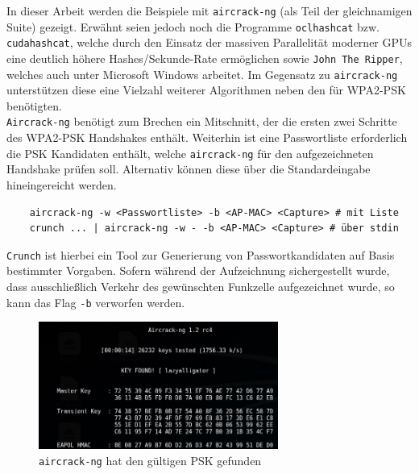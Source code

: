 In dieser Arbeit werden die Beispiele mit \texttt{aircrack-ng} (als Teil der gleichnamigen Suite) gezeigt. Erwähnt seien jedoch noch die Programme \texttt{oclhashcat} bzw. \texttt{cudahashcat}, welche durch den Einsatz der massiven Parallelität moderner GPUs eine deutlich höhere Hashes/Sekunde-Rate ermöglichen sowie \texttt{John The Ripper}, welches auch unter Microsoft Windows arbeitet. Im Gegensatz zu \texttt{aircrack-ng} unterstützen diese eine Vielzahl weiterer Algorithmen neben den für WPA2-PSK benötigten.\\

\texttt{Aircrack-ng} benötigt zum Brechen ein Mitschnitt, der die ersten zwei Schritte des WPA2-PSK Handshakes enthält.
Weiterhin ist eine Passwortliste erforderlich die PSK Kandidaten enthält, welche \texttt{aircrack-ng} für den aufgezeichneten Handshake prüfen soll. Alternativ können diese über die Standardeingabe hineingereicht werden.
\begin{Verbatim}
	aircrack-ng -w <Passwortliste> -b <AP-MAC> <Capture> # mit Liste
	crunch ... | aircrack-ng -w - -b <AP-MAC> <Capture> # über stdin
\end{Verbatim}
\texttt{Crunch} ist hierbei ein Tool zur Generierung von Passwortkandidaten auf Basis bestimmter Vorgaben.
Sofern während der Aufzeichnung sichergestellt wurde, dass ausschließlich Verkehr des gewünschten Funkzelle aufgezeichnet wurde, so kann das Flag \texttt{-b} verworfen werden.

\begin{figure}[ht]
	\centering
	\includegraphics[width=0.7\textwidth]{graphics/aircrack_success}
	\caption[Aircrack-ng]{\texttt{aircrack-ng} hat den gültigen PSK gefunden}
\end{figure}

\FloatBarrier